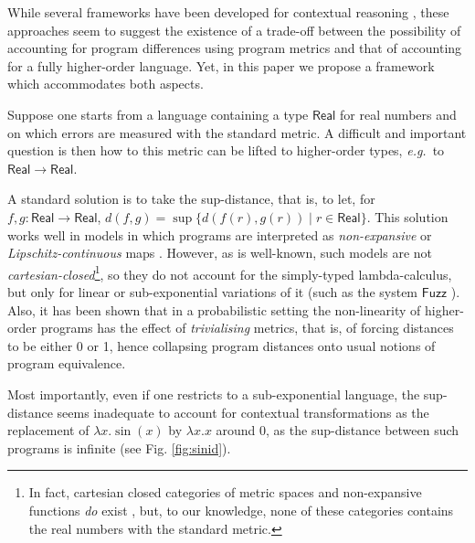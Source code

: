   While several frameworks  have been developed for contextual reasoning \cite{10.1145/1932681.1863568,Gaboardi_2013,Azevedo_de_Amorim_2017,chaudhuri, dallago:differential-stlc},  these approaches seem to suggest the existence of a trade-off between the possibility of accounting for 
program differences using program metrics and that of accounting for  a fully higher-order language. Yet, in this paper we propose a framework which accommodates both aspects. 

%

Suppose one starts from a language  containing a type $\mathsf{Real}$ for real numbers and on which errors are measured with the standard metric. A difficult  and important question is then how to this metric  can be lifted to higher-order types, \emph{e.g.}~to $\mathsf{Real}\to \mathsf{Real}$.



A standard solution is to take the sup-distance, that is, to let, for $f,g:\mathsf{Real}\to \mathsf{Real}$, $d(f,g)=\sup\{d(f(r),g(r))\mid r\in \mathsf{Real}\}$. This solution works well in models in which programs are interpreted as \emph{non-expansive} or \emph{Lipschitz-continuous} maps \cite{Hofmann2014, Azevedo_de_Amorim_2017}. However, as is well-known, such models are not \emph{cartesian-closed}\footnote{In fact, cartesian closed categories of metric spaces and non-expansive functions \emph{do} exist \cite{Escardo1999, Stubbe2009}, but, to our knowledge, none of these categories contains the real numbers with the standard metric.}, so they do not account for 
 the simply-typed lambda-calculus, but only for linear or sub-exponential variations of it (such as the system $\mathsf{Fuzz}$ \cite{10.1145/1932681.1863568,Gaboardi_2013,Azevedo_de_Amorim_2017}).
 Also, it has been shown \cite{10.1109/LICS.2015.64} that in a probabilistic setting the non-linearity of higher-order programs has the effect of \emph{trivialising} metrics, that is, of forcing distances to be either 0 or 1, hence collapsing program distances onto usual notions of program equivalence.


Most importantly, even if one restricts to a sub-exponential language, the sup-distance seems inadequate to account for contextual transformations as the replacement of $\lambda x.\sin(x)$ by $\lambda x.x$ around 0,  as the sup-distance between such programs is infinite (see Fig. \ref{fig:sinid}). 
 
